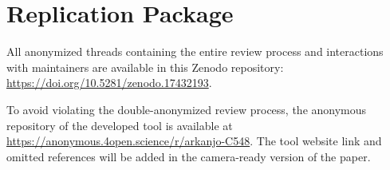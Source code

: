 \documentclass[10pt,conference]{IEEEtran}
\begin{document}
\section*{Replication Package}

All anonymized threads containing the entire review process and interactions with maintainers are available in this Zenodo repository: \href{https://doi.org/10.5281/zenodo.17432193}{https://doi.org/10.5281/zenodo.17432193}.

To avoid violating the double-anonymized review process, the anonymous repository of the developed tool is available at \url{https://anonymous.4open.science/r/arkanjo-C548}. The tool website link and omitted references will be added in the camera-ready version of the paper.

\newpage


\end{document}
